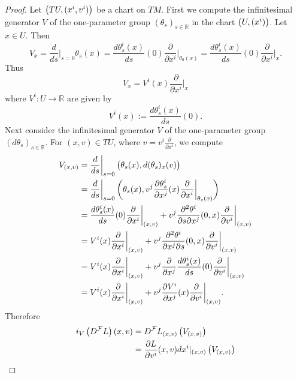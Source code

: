 \begin{proof}
	Let $\del[1]{TU,(x^i,v^i)}$ be a chart on $TM$. First we compute the infinitesimal generator $V$ of the one-parameter group $(\theta_s)_{s \in \mathbb{R}}$ in the chart $\del[1]{U,(x^i)}$. Let $x \in U$. Then
	\begin{equation*}
		V_x = \frac{d}{ds}\bigg\vert_{s = 0}\theta_s(x) = \frac{d\theta_s^i(x)}{ds}(0) \frac{\partial}{\partial x^i}\bigg\vert_{\theta_0(x)} = \frac{d\theta_s^i(x)}{ds}(0) \frac{\partial}{\partial x^i}\bigg\vert_x.
	\end{equation*}
	Thus 
	\begin{equation*}
		V_x = V^i(x) \frac{\partial}{\partial x^i}\bigg\vert_x 
	\end{equation*}
	\noindent where $V^i : U \to \mathbb{R}$ are given by
	\begin{equation*}
		V^i(x) := \frac{d \theta_s^i(x)}{ds}(0).
	\end{equation*}
	Next consider the infinitesimal generator $V$ of the one-parameter group $(d\theta_s)_{s \in \mathbb{R}}$. For $(x,v) \in TU$, where $v = v^i \frac{\partial}{\partial x^i}$, we compute
	\begin{align*}
		V_{(x,v)} &= \frac{d}{ds}\bigg\vert_{s = 0} \del[1]{\theta_s(x),d(\theta_s)_x(v)}\\
		&= \frac{d}{ds}\bigg\vert_{s = 0} \del[3]{\theta_s(x),v^j\frac{\partial \theta_s^i}{\partial x^j}(x)\frac{\partial}{\partial x^i}\bigg\vert_{\theta_s(x)}}\\
		&= \frac{d \theta_s^i(x)}{ds}(0)\frac{\partial}{\partial x^i}\bigg\vert_{(x,v)} + v^j\frac{\partial^2 \theta^i}{\partial s\partial x^j}(0,x) \frac{\partial}{\partial v^i}\bigg\vert_{(x,v)}\\
		&= V^i(x)\frac{\partial}{\partial x^i}\bigg\vert_{(x,v)} + v^j\frac{\partial^2 \theta^i}{\partial x^j\partial s}(0,x) \frac{\partial}{\partial v^i}\bigg\vert_{(x,v)}\\
		&= V^i(x)\frac{\partial}{\partial x^i}\bigg\vert_{(x,v)} + v^j\frac{\partial}{\partial x^j} \frac{d \theta_s^i(x)}{ds}(0) \frac{\partial}{\partial v^i}\bigg\vert_{(x,v)}\\
		&= V^i(x)\frac{\partial}{\partial x^i}\bigg\vert_{(x,v)} + v^j\frac{\partial V^i}{\partial x^j}(x) \frac{\partial}{\partial v^i}\bigg\vert_{(x,v)}.
	\end{align*}
	Therefore
	\begin{align*}
		i_V\del[1]{D^\mathcal{F}L}(x,v) &= D^\mathcal{F}L_{(x,v)}\del[1]{V_{(x,v)}}\\
		&= \frac{\partial L}{\partial v^i}(x,v)dx^i\vert_{(x,v)}\del[1]{V_{(x,v)}}\\

\end{align*}
\end{proof}
